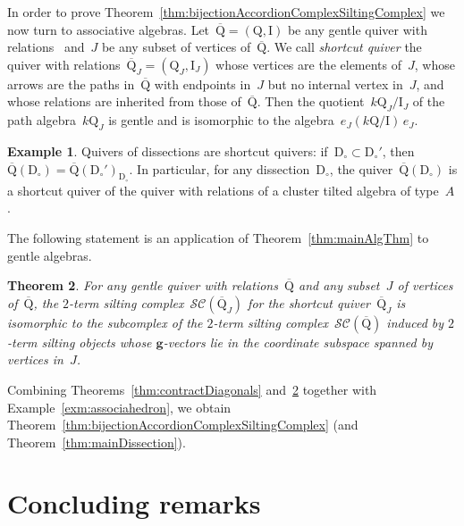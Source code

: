 \documentclass{amsart}
\newtheorem{theorem}{Theorem}%
\theoremstyle{definition}
\newtheorem{example}[theorem]{Example}
\renewcommand{\b}[1]{\mathbf{#1}} %
\newcommand{\darkblue}{\color{darkblue}} %
\newcommand{\defn}[1]{\textsl{\darkblue #1}} %
\newcommand{\dissection}{\mathrm{D}} %
\newcommand{\quiver}{\mathrm{Q}} %
\newcommand{\relations}{\mathrm{I}} %
\newcommand{\siltingComplex}{\mathcal{SC}}
\begin{document}
In order to prove Theorem~\ref{thm:bijectionAccordionComplexSiltingComplex} we now turn to associative algebras.
Let~$\overline{\quiver} = (\quiver, \relations)$ be any gentle quiver with relations~\cite{ButlerRingel} and~$J$ be any subset of vertices of~$\overline{\quiver}$.
We call \defn{shortcut quiver} the quiver with relations~$\overline{\quiver}_J = (\quiver_J, \relations_J)$ whose vertices are the elements of~$J$, whose arrows are the paths in~$\overline{\quiver}$ with endpoints in~$J$ but no internal vertex in~$J$, and whose relations are inherited from those of~$\overline{\quiver}$.
Then the quotient~$k\quiver_J/\relations_J$ of the path algebra~$k\quiver_J$ is gentle and is isomorphic to the algebra~$e_J (k\quiver/\relations) \, e_J$.

\begin{example}
Quivers of dissections are shortcut quivers: if~$\dissection_\circ \subset \dissection_\circ'$, then~${\overline{\quiver}(\dissection_\circ) = \overline{\quiver}(\dissection_\circ')_{\dissection_\circ}}$.
In particular, for any dissection~$\dissection_\circ$, the quiver~$\overline{\quiver}(\dissection_\circ)$ is a shortcut quiver of the quiver with relations of a cluster tilted algebra of type~$A$.
\end{example}

\enlargethispage{.1cm}
The following statement is an application of Theorem~\ref{thm:mainAlgThm} to gentle algebras.

\begin{theorem}
\label{thm:contractVertices}
For any gentle quiver with relations~$\overline{\quiver}$ and any subset~$J$ of vertices of~$\overline{\quiver}$, the \mbox{$2$-term} silting complex~$\siltingComplex(\overline{\quiver}_J)$ for the shortcut quiver~$\overline{\quiver}_J$ is isomorphic to the subcomplex of the $2$-term silting complex~$\siltingComplex(\overline{\quiver})$ induced by $2$-term silting objects whose $\b{g}$-vectors lie in the coordinate subspace spanned by vertices in~$J$.
\end{theorem}

Combining Theorems~\ref{thm:contractDiagonals} and~\ref{thm:contractVertices} together with Example~\ref{exm:associahedron}, we obtain Theorem~\ref{thm:bijectionAccordionComplexSiltingComplex} (and Theorem~\ref{thm:mainDissection}).


\section{Concluding remarks}
\end{document}
